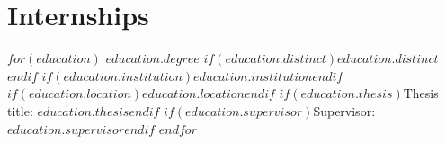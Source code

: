 \documentclass[]{deedy-resume-openfont}
\begin{document}
\section{Internships}
$for(education)$
%
{$education.degree$}%
{$if(education.distinct)$$education.distinct$$endif$}%
{$if(education.institution)$\emph{$education.institution$}$endif$}%
{$if(education.location)$$education.location$$endif$}%
{$if(education.thesis)$Thesis title: \textbf{$education.thesis$}$endif$}%
{$if(education.supervisor)$Supervisor: $education.supervisor$$endif$}%
$endfor$
\sectionsep
%
%
%
%

%
%
%

\end{document}
